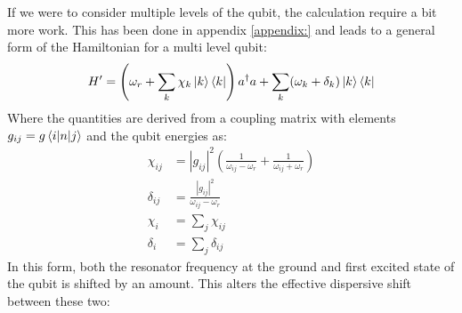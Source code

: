If we were to consider multiple levels of the qubit, the calculation require a  bit more work. This has been done in appendix \ref{appendix:} and leads to a general form of the Hamiltonian for a multi level qubit:
\begin{equation}\label{eq:multi_qubit_dispersive_hamiltonian}
    H' = \left(\omega_r + \sum_k \chi_k \ket{k}\bra{k} \right) a^\dagger a + \sum_k (\omega_k + \delta_k)\ket{k}\bra{k}
\end{equation}
Where the quantities are derived from a coupling matrix with elements $g_{ij} = g \mel{i}{n}{j}$ and the qubit energies as:
\begin{align}
    \chi_{ij} &= |g_{ij}|^2 \left(\frac{1}{\omega_{ij} - \omega_r} + \frac{1}{\omega_{ij} + \omega_r} \right) \\
    \delta_{ij} &= \frac{|g_{ij}|^2 }{\omega_{ij} - \omega_r} \\
    \chi_{i} &= \sum_j \chi_{ij} \\
    \delta_{i} &= \sum_j \delta_{ij} 
\end{align}
In this form, both the resonator frequency at the ground and first excited state of the qubit is shifted by an amount. This alters the effective dispersive shift between these two:
